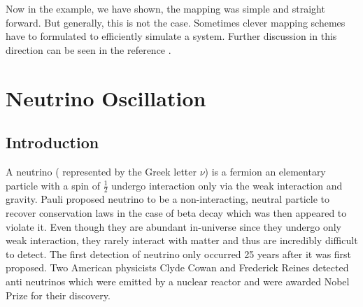 \documentclass[12pt,a4paper]{report}
\begin{document}
Now in the example, we have shown, the mapping was simple and straight forward. But generally, this is not the case. Sometimes clever mapping schemes have to formulated to efficiently simulate a system. Further discussion in this direction can be seen in the reference \cite{georgescu}.

\newpage
\thispagestyle{empty}
\mbox{}
\newpage
\chapter{Neutrino Oscillation}
\section{Introduction}
A neutrino  ( represented by the Greek letter $\nu$) is a fermion an elementary particle with a spin of $\frac{1}{2}$ undergo interaction only via the weak interaction and gravity. Pauli proposed neutrino to be a non-interacting, neutral particle to recover conservation laws in the case of beta decay which was then appeared to violate it. Even though they are abundant in-universe since they undergo only weak interaction, they rarely interact with matter and thus are incredibly difficult to detect. The first detection of neutrino only occurred 25 years after it was first proposed. Two American physicists Clyde Cowan and Frederick Reines detected anti neutrinos which were emitted by a nuclear reactor and were awarded Nobel Prize for their discovery.\par
\end{document}
